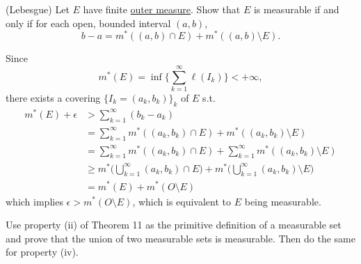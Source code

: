   \begin{exercise}[Royden 2.20]
    (Lebesgue) Let $E$ have finite \hyperref[def:outer-measure]{outer measure}. Show that $E$ is measurable if and only if for each open, bounded interval $(a, b)$,
    \begin{equation*}
      b - a = m^{\ast}((a, b) \cap E) + m^{\ast}((a, b) \setminus E).
    \end{equation*}
  \end{exercise}
  \begin{solution}
    Since 
    \begin{equation}
      m^\ast (E) = \inf \bigg\{ \sum_{k=1}^\infty \ell(I_k) \bigg\} < +\infty, 
    \end{equation}
    there exists a covering $\{I_k = (a_k, b_k)\}_k$  of $E$ s.t. 
    \begin{align}
      m^\ast (E) + \epsilon & > \sum_{k=1}^\infty (b_k - a_k) \\ 
                            & = \sum_{k=1}^\infty m^\ast ((a_k, b_k) \cap E) + m^\ast ((a_k, b_k) \setminus E) \\ 
                            & = \sum_{k=1}^\infty m^\ast ((a_k, b_k) \cap E) + \sum_{k=1}^\infty m^\ast ((a_k, b_k) \setminus E) \\ 
                            & \geq m^\ast \bigg( \bigcup_{k=1}^\infty (a_k, b_k) \cap E \bigg) + m^\ast \bigg( \bigcup_{k=1}^\infty (a_k, b_k) \setminus E \bigg) \\ 
                            & = m^\ast (E) + m^\ast (O \setminus E) 
    \end{align}
    which implies $\epsilon > m^\ast (O \setminus E)$, which is equivalent to $E$ being measurable. 
  \end{solution}

  \begin{exercise}[Royden 2.21]
    Use property (ii) of Theorem 11 as the primitive definition of a measurable set and prove that the union of two measurable sets is measurable. Then do the same for property (iv).
  \end{exercise}

